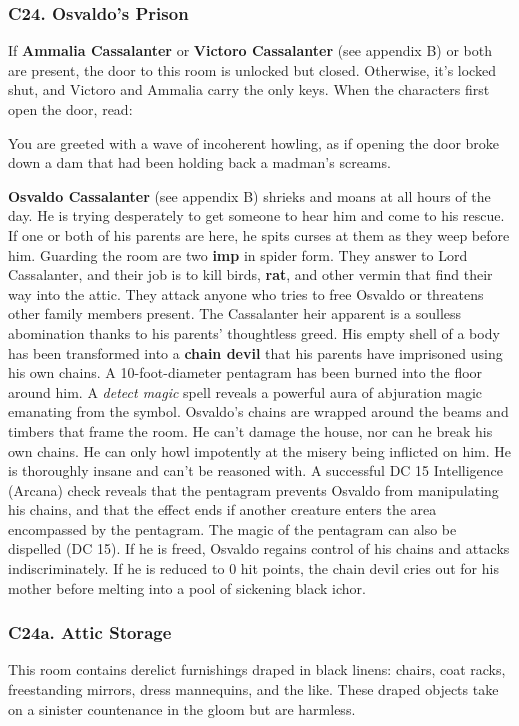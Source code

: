 \documentclass[10pt,a4paper,twoside,twocolumn,openany,nodeprecatedcode]{dndbook}
\begin{document}
\subsubsection{C24. Osvaldo's Prison}
If \textbf{Ammalia Cassalanter} or \textbf{Victoro Cassalanter} (see appendix B) or both are present, the door to this room is unlocked but closed. Otherwise, it's locked shut, and Victoro and Ammalia carry the only keys. When the characters first open the door, read:
\begin{DndReadAloud}{}
You are greeted with a wave of incoherent howling, as if opening the door broke down a dam that had been holding back a madman's screams.
\end{DndReadAloud}

\textbf{Osvaldo Cassalanter} (see appendix B) shrieks and moans at all hours of the day. He is trying desperately to get someone to hear him and come to his rescue. If one or both of his parents are here, he spits curses at them as they weep before him.
Guarding the room are two \textbf{imp} in spider form. They answer to Lord Cassalanter, and their job is to kill birds, \textbf{rat}, and other vermin that find their way into the attic. They attack anyone who tries to free Osvaldo or threatens other family members present.
The Cassalanter heir apparent is a soulless abomination thanks to his parents' thoughtless greed. His empty shell of a body has been transformed into a \textbf{chain devil} that his parents have imprisoned using his own chains. A 10-foot-diameter pentagram has been burned into the floor around him. A \textit{detect magic} spell reveals a powerful aura of abjuration magic emanating from the symbol.
Osvaldo's chains are wrapped around the beams and timbers that frame the room. He can't damage the house, nor can he break his own chains. He can only howl impotently at the misery being inflicted on him. He is thoroughly insane and can't be reasoned with.
A successful DC 15 Intelligence (Arcana) check reveals that the pentagram prevents Osvaldo from manipulating his chains, and that the effect ends if another creature enters the area encompassed by the pentagram. The magic of the pentagram can also be dispelled (DC 15). If he is freed, Osvaldo regains control of his chains and attacks indiscriminately. If he is reduced to 0 hit points, the chain devil cries out for his mother before melting into a pool of sickening black ichor.
\subsubsection{C24a. Attic Storage}
This room contains derelict furnishings draped in black linens: chairs, coat racks, freestanding mirrors, dress mannequins, and the like. These draped objects take on a sinister countenance in the gloom but are harmless.
\end{document}
